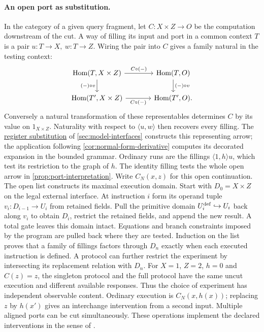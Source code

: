 \documentclass[11pt,a4paper]{article}
\theoremstyle{definition}
\theoremstyle{remark}\newaliascnt{remark}{theorem}
\newcommand{\Hom}{\operatorname{Hom}}
\numberwithin{equation}{section}
\begin{document}
\paragraph{An open port as substitution.}
In the category of a given query fragment, let \(C:X\times Z\to O\) be the computation downstream of the cut. A way of filling its input and port in a common context \(T\) is a pair \(u:T\to X,\ w:T\to Z\). Wiring the pair into \(C\) gives a family natural in the testing context:
\[
\begin{tikzcd}[column sep=large]
 \Hom(T,X\times Z)\arrow[r,"C\circ(-)"]\arrow[d,"(-)\circ v"']&
 \Hom(T,O)\arrow[d,"(-)\circ v"]\\
 \Hom(T',X\times Z)\arrow[r,"C\circ(-)"']&\Hom(T',O) .
\end{tikzcd}
\]
Conversely a natural transformation of these representables determines \(C\) by its value on \(1_{X\times Z}\). Naturality with respect to \(\langle u,w\rangle\) then recovers every filling. The \hyperref[sec:cut-substitution]{register substitution} of \cref{sec:model-interfaces} constructs this representing arrow; the application following \cref{cor:normal-form-derivative} computes its decorated expansion in the bounded grammar. Ordinary runs are the fillings \(\langle1,h\rangle u\), which test its restriction to the graph of \(h\). The identity filling tests the whole open arrow in \cref{prop:port-interpretation}.
Write \(C_N(x,z)\) for this open continuation. The open list constructs its maximal execution domain. Start with $D_0=X\times Z$ on the legal external interface. At instruction $i$ form its operand tuple $v_i:D_{i-1}\to U_i$ from retained fields. Pull the primitive domain $U_i^{\rm def}\hookrightarrow U_i$ back along $v_i$ to obtain $D_i$, restrict the retained fields, and append the new result. A total gate leaves this domain intact. Equations and branch constraints imposed by the program are pulled back where they are tested. Induction on the list proves that a family of fillings factors through $D_n$ exactly when each executed instruction is defined. A protocol can further restrict the experiment by intersecting its replacement relation with $D_n$. For $X=1$, $Z=2$, $h=0$ and $C(z)=z$, the singleton protocol and the full protocol have the same uncut execution and different available responses. Thus the choice of experiment has independent observable content. Ordinary execution is $C_N(x,h(x))$; replacing $z$ by $h(x')$ gives an interchange intervention from a second input. Multiple aligned ports can be cut simultaneously. These operations implement the declared interventions in the sense of \cite{causal-abstraction}.
\end{document}
